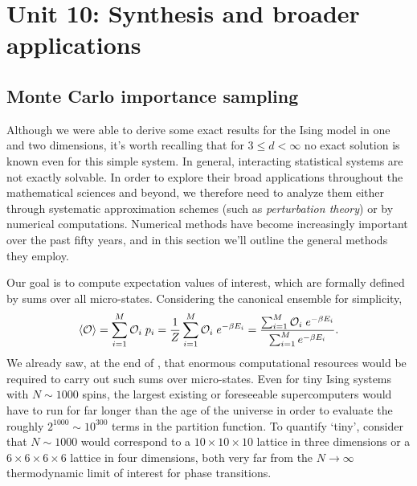 \renewcommand{\thisunit}{MATH327 Unit 10}
\renewcommand{\moddate}{Last modified 12 May 2023}
\setcounter{section}{10}
\setcounter{subsection}{0}
{}
\section*{Unit 10: Synthesis and broader applications} %
\subsection{\label{sec:MonteCarlo}Monte Carlo importance sampling}
Although we were able to derive some exact results for the Ising model in one and two dimensions, it's worth recalling that for $3 \leq d < \infty$ no exact solution is known even for this simple system.
In general, interacting statistical systems are not exactly solvable.
In order to explore their broad applications throughout the mathematical sciences and beyond, we therefore need to analyze them either through systematic approximation schemes (such as \emph{perturbation theory}) or by numerical computations.
Numerical methods have become increasingly important over the past fifty years, and in this section we'll outline the general methods they employ.

Our goal is to compute expectation values of interest, which are formally defined by sums over all micro-states.
Considering the canonical ensemble for simplicity,
\begin{equation*}
  \left\langle \mathcal O \right\rangle = \sum_{i = 1}^M \mathcal O_i \; p_i = \frac{1}{Z} \sum_{i = 1}^M \mathcal O_i \; e^{-\beta E_i} = \frac{\sum_{i = 1}^M \mathcal O_i \; e^{-\beta E_i}}{\sum_{i = 1}^M e^{-\beta E_i}}.
\end{equation*}
We already saw, at the end of , that enormous computational resources would be required to carry out such sums over micro-states.
Even for tiny Ising systems with $N \sim 1000$ spins, the largest existing or foreseeable supercomputers would have to run for far longer than the age of the universe in order to evaluate the roughly $2^{1000} \sim 10^{300}$ terms in the partition function.
To quantify `tiny', consider that $N \sim 1000$ would correspond to a $10\times 10\times 10$ lattice in three dimensions or a $6\times 6\times 6\times 6$ lattice in four dimensions, both very far from the $N \to \infty$ thermodynamic limit of interest for phase transitions.

